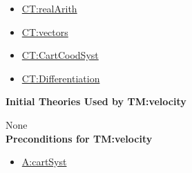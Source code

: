 \documentclass[12pt]{article}
\begin{document}
\begin{itemize}
\item \hyperref[CT:realArith]{CT:realArith}
\item \hyperref[CT:vectors]{CT:vectors}
\item \hyperref[CT:CartCoordSyst]{CT:CartCoodSyst}
\item \hyperref[CT:Differentiation]{CT:Differentiation}
\end{itemize}

\noindent \textbf{Initial Theories Used by TM:velocity}

None
~\\

\noindent \textbf{Preconditions for TM:velocity}

\begin{itemize}
\item \hyperref[cartSyst]{A:cartSyst}
\end{itemize}
\end{document}
